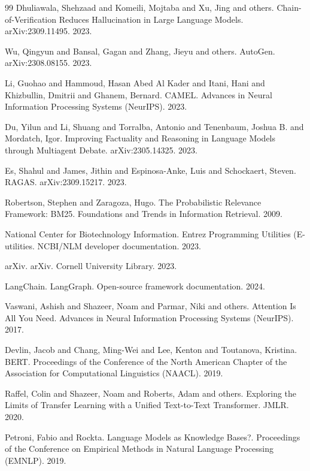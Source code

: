 \begin{thebibliography}{99}
Dhuliawala, Shehzaad and Komeili, Mojtaba and Xu, Jing and others. Chain-of-Verification Reduces Hallucination in Large Language Models. arXiv:2309.11495. 2023.

Wu, Qingyun and Bansal, Gagan and Zhang, Jieyu and others. AutoGen. arXiv:2308.08155. 2023.

Li, Guohao and Hammoud, Hasan Abed Al Kader and Itani, Hani and Khizbullin, Dmitrii and Ghanem, Bernard. CAMEL. Advances in Neural Information Processing Systems (NeurIPS). 2023.

Du, Yilun and Li, Shuang and Torralba, Antonio and Tenenbaum, Joshua B. and Mordatch, Igor. Improving Factuality and Reasoning in Language Models through Multiagent Debate. arXiv:2305.14325. 2023.

Es, Shahul and James, Jithin and Espinosa-Anke, Luis and Schockaert, Steven. RAGAS. arXiv:2309.15217. 2023.

Robertson, Stephen and Zaragoza, Hugo. The Probabilistic Relevance Framework: BM25. Foundations and Trends in Information Retrieval. 2009.

National Center for Biotechnology Information. Entrez Programming Utilities (E-utilities. NCBI/NLM developer documentation. 2023.

arXiv. arXiv. Cornell University Library. 2023.

LangChain. LangGraph. Open-source framework documentation. 2024.

Vaswani, Ashish and Shazeer, Noam and Parmar, Niki and others. Attention Is All You Need. Advances in Neural Information Processing Systems (NeurIPS). 2017.

Devlin, Jacob and Chang, Ming-Wei and Lee, Kenton and Toutanova, Kristina. BERT. Proceedings of the Conference of the North American Chapter of the Association for Computational Linguistics (NAACL). 2019.

Raffel, Colin and Shazeer, Noam and Roberts, Adam and others. Exploring the Limits of Transfer Learning with a Unified Text-to-Text Transformer. JMLR. 2020.

Petroni, Fabio and Rockta. Language Models as Knowledge Bases?. Proceedings of the Conference on Empirical Methods in Natural Language Processing (EMNLP). 2019.


\end{thebibliography}
